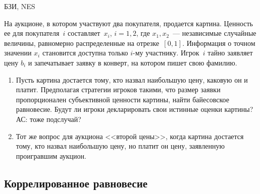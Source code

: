 \begin{problem}
\begin{source}
БЗИ, NES
\end{source} На аукционе, в
котором участвуют два покупателя, продается картина.
Ценность ее для покупателя~$i$ составляет~$x_i$, $i=1,2$,
где $x_1,x_2$~--- независимые случайные величины,
равномерно распределенные на отрезке~$[0,1]$. Информация о точном значении $x_i$ становится доступна только $i$-му участнику. Игрок~$i$ тайно
заявляет цену $b_i$ и запечатывает заявку в конверт, на
котором пишет свою фамилию.

\begin{enumerate}

\item Пусть картина достается тому, кто назвал наибольшую
цену, каковую он и платит. Предполагая стратегии игроков
такими, что размер заявки пропорционален субъективной
ценности картины, найти байесовское равновесие. Будут ли
игроки декларировать свои истинные оценки картины?
{\red АС: тоже подслучай?}

\item Тот же вопрос для аукциона <<второй цены>>, когда
картина достается тому, кто назвал наибольшую цену, но
платит он цену, заявленную проигравшим аукцион.

\end{enumerate}








\begin{sol}

\end{sol}
\end{problem}



\subsection{Коррелированное равновесие}

